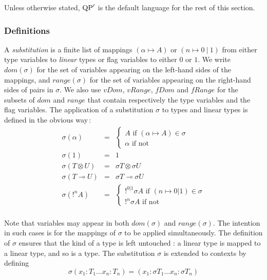 Unless otherwise stated, ${\rm QP}'$ is the default language for the rest of this section.

\subsubsection{Definitions}

\begin{defn} A \textit{substitution} is a finite list of mappings $(\alpha \mapsto A)$ or $(n \mapsto 0 ~|~ 1)$
	from either type variables to \textit{linear} types 	or flag variables to either $0$ or $1$.
	We write $dom(\sigma)$ for the set of variables appearing on the left-hand sides of the mappings, and $range(\sigma)$ for the set of variables
	appearing on the right-hand sides of pairs in $\sigma$. We also use $vDom$, $vRange$, $fDom$ and $fRange$ for the subsets of $dom$ and $range$
	that contain respectively the type variables and the flag variables.
	The application of a substitution $\sigma$ to types and linear types is defined in the obvious way\,:
	$$
	\begin{array}{lcl}
		\sigma (\alpha) &=& \left\{ \begin{array}{l}
		                              A \text{ if } (\alpha \mapsto A) \in \sigma \\
      		                        \alpha \text{ if not}
		                            \end{array} \right. \\
		\sigma(1) &=& 1 \\
		\sigma(T \otimes U) &=& \sigma T \otimes \sigma U \\
		\sigma(T \multimap U) &=& \sigma T \multimap \sigma U \\
		\sigma(!^n A) &=& \left\{ \begin{array}{l}
																	!^{0|1} \sigma A \text{ if } (n \mapsto 0|1) \in \sigma \\
																	!^n \sigma A \text{ if not}
																\end{array} \right. \\
	\end{array}
	$$
\end{defn}	

Note that variables may appear in both $dom(\sigma)$ and $range(\sigma)$. The intention in such cases is for the mappings of $\sigma$ to
be applied simultaneously. The definition of $\sigma$ ensures that the kind of a type is left untouched : a linear type is mapped to a linear
type, and so is a type. The substitution $\sigma$ is extended to contexts by defining
 		$$\sigma (x_1 : T_1 \dots x_n : T_n) = (x_1 : \sigma T_1 \dots x_n : \sigma T_n)$$
 		
